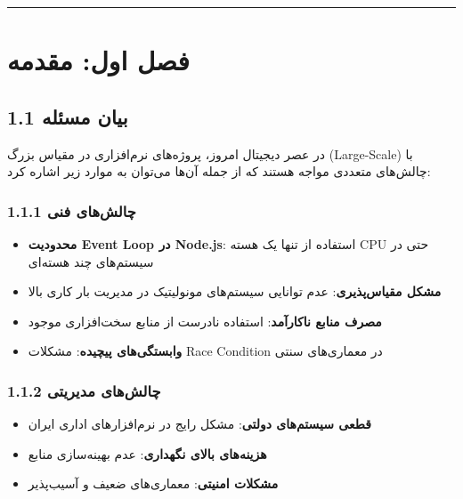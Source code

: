 \documentclass[
]{article}
\providecommand{\tightlist}{%
  \setlength{\itemsep}{0pt}\setlength{\parskip}{0pt}}
\begin{document}
\begin{center}\rule{0.5\linewidth}{0.5pt}\end{center}

\section{فصل اول:
مقدمه}\label{ux641ux635ux644-ux627ux648ux644-ux645ux642ux62fux645ux647}

\subsection{1.1 بیان
مسئله}\label{ux628ux6ccux627ux646-ux645ux633ux626ux644ux647}

در عصر دیجیتال امروز، پروژه‌های نرم‌افزاری در مقیاس بزرگ (Large-Scale) با
چالش‌های متعددی مواجه هستند که از جمله آن‌ها می‌توان به موارد زیر اشاره
کرد:

\subsubsection{1.1.1 چالش‌های
فنی}\label{ux686ux627ux644ux634ux647ux627ux6cc-ux641ux646ux6cc}

\begin{itemize}
\tightlist
\item
  \textbf{محدودیت Event Loop در Node.js}: استفاده از تنها یک هسته CPU
  حتی در سیستم‌های چند هسته‌ای
\item
  \textbf{مشکل مقیاس‌پذیری}: عدم توانایی سیستم‌های مونولیتیک در مدیریت بار
  کاری بالا
\item
  \textbf{مصرف منابع ناکارآمد}: استفاده نادرست از منابع سخت‌افزاری موجود
\item
  \textbf{وابستگی‌های پیچیده}: مشکلات Race Condition در معماری‌های سنتی
\end{itemize}

\subsubsection{1.1.2 چالش‌های
مدیریتی}\label{ux686ux627ux644ux634ux647ux627ux6cc-ux645ux62fux6ccux631ux6ccux62aux6cc}

\begin{itemize}
\tightlist
\item
  \textbf{قطعی سیستم‌های دولتی}: مشکل رایج در نرم‌افزارهای اداری ایران
\item
  \textbf{هزینه‌های بالای نگهداری}: عدم بهینه‌سازی منابع
\item
  \textbf{مشکلات امنیتی}: معماری‌های ضعیف و آسیب‌پذیر
\end{itemize}
\end{document}

